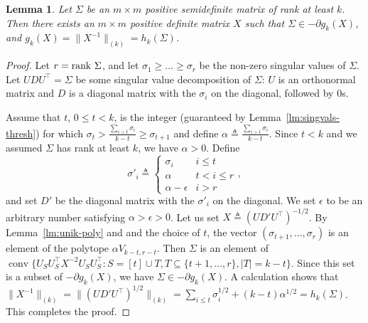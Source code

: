 \documentclass{article}
\newtheorem{lemma}{Lemma}[theorem]
\DeclareMathOperator{\conv}{conv}
\newcommand{\tra}{\intercal}
\begin{document}
\begin{lemma}\label{lm:subgr-soln}
  Let $\Sigma$ be an $m\times m$ positive semidefinite matrix of rank at
  least $k$. Then there exists an $m\times m$ positive definite matrix
  $X$ such that $\Sigma \in -\partial g_k(X)$, and $g_k(X) = \|X^{-1}\|_{(k)} = h_k(\Sigma)$. 
\end{lemma}
\begin{proof}
  Let $r = {\rm rank}~\Sigma$, and let $\sigma_1 \geq \ldots \geq \sigma_r$ be
  the non-zero singular values of $\Sigma$. Let $U D U^\tra = \Sigma$ be
  some singular value decomposition of $\Sigma$: $U$ is an orthonormal
  matrix and $D$ is a diagonal matrix with the $\sigma_i$ on the
  diagonal, followed by $0$s.

  Assume that $t$, $0 \leq t < k$, is the integer (guaranteed by
  Lemma~\ref{lm:singvals-thresh}) for which $ \sigma_t > \frac{\sum_{i
      > t}{\sigma_i}}{k - t} \geq \sigma_{t+1}$ and define $\alpha
  \triangleq \frac{\sum_{i > t}{\sigma_i}}{k - t}$. Since $t < k$ and
 we assumed $\Sigma$ has rank at least $k$, we have $\alpha > 0$.  Define
  \[
  \sigma'_{i} \triangleq
  \begin{cases}
    \sigma_{i} &i \leq t\\
    \alpha &t < i \leq r\\
    \alpha - \epsilon & i > r
  \end{cases},
  \]
  and set $D'$ be the diagonal matrix with the $\sigma'_i$ on the diagonal.
  We set $\epsilon$ to be an arbitrary number satisfying $\alpha >
  \epsilon > 0$. Let us set $X \triangleq (UD'U^\tra)^{-1/2}$. By
  Lemma~\ref{lm:unik-poly} and and the choice of $t$, the vector
  $(\sigma_{t+1}, \ldots, \sigma_r)$ is an element of the polytope
  $\alpha V_{k-t, r-t}$. Then $\Sigma$ is an element of $\conv\{U_SU_S^\tra
  X^{-2} U_S U_S^\tra: S = [t] \cup T, T \subseteq \{t+1, \ldots, r\},
  |T| = k-t\}$. Since this set is a subset of $-\partial g_k(X)$, we
  have $\Sigma \in -\partial g_k(X)$. A calculation shows that
  $\|X^{-1}\|_{(k)} = \|(UD'U^\tra)^{1/2}\|_{(k)} = \sum_{i \leq
    t}{\sigma_i^{1/2}} + (k-t)\alpha^{1/2} = h_k(\Sigma)$. This completes
  the proof. 
\end{proof}
\end{document}
